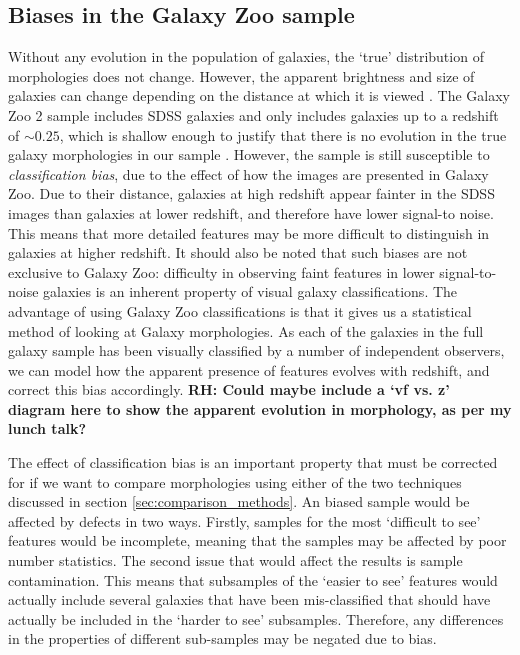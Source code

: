 \documentclass[useAMS,usenatbib]{mn2e}
\newcommand{\rh}[1]{{\bf \textcolor{RoyalPurple}{RH: #1}}}
\begin{document}
\subsection{Biases in the Galaxy Zoo sample}
Without any evolution in the population of galaxies, the `true' distribution of morphologies does not change. However, the apparent brightness and size of galaxies can change depending on the distance at which it is viewed \citep{Bamford_09}. The Galaxy Zoo 2 sample includes SDSS galaxies and only includes galaxies up to a redshift of $\sim 0.25$, which is shallow enough to justify that there is no evolution in the true galaxy morphologies in our sample \citep{Willett_13}. However, the sample is still susceptible to \textit{classification bias}, due to the effect of how the images are presented in Galaxy Zoo. Due to their distance, galaxies at high redshift appear fainter in the SDSS images than galaxies at lower redshift, and therefore have lower signal-to noise. This means that more detailed features may be more difficult to distinguish in galaxies at higher redshift. It should also be noted that such biases are not exclusive to Galaxy Zoo: difficulty in observing faint features in lower signal-to-noise galaxies is an inherent property of visual galaxy classifications. The advantage of using Galaxy Zoo classifications is that it gives us a statistical method of looking at Galaxy morphologies. As each of the galaxies in the full galaxy sample has been visually classified by a number of independent observers, we can model how the apparent presence of features evolves with redshift, and correct this bias accordingly.  \rh{Could maybe include a `vf vs. z' diagram here to show the apparent evolution in morphology, as per my lunch talk?}

The effect of classification bias is an important property that must be corrected for if we want to compare morphologies using either of the two techniques discussed in section \ref{sec:comparison_methods}. An biased sample would be affected by defects in two ways. Firstly, samples for the most `difficult to see' features would be incomplete, meaning that the samples may be affected by poor number statistics. The second issue that would affect the results is sample contamination. This means that subsamples of the `easier to see' features would actually include several galaxies that have been mis-classified that should have actually be included in the `harder to see' subsamples. Therefore, any differences in the properties of different sub-samples may be negated due to bias.
\end{document}
